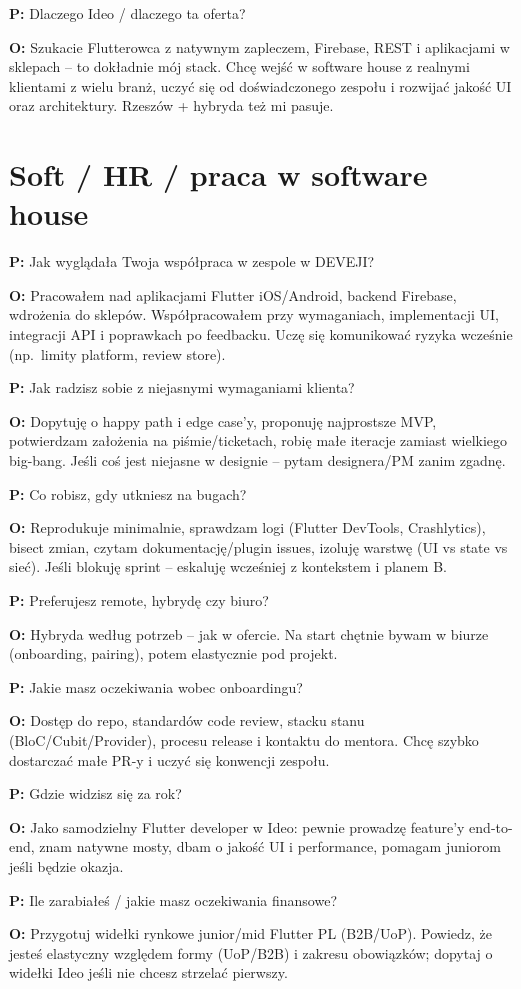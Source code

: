 \documentclass[11pt,a4paper]{article}
\newcommand{\pyt}[1]{\par\medskip\noindent\textbf{P:} #1\par}
\newcommand{\odp}[1]{\noindent\textbf{O:} #1\par}
\begin{document}
\pyt{Dlaczego Ideo / dlaczego ta oferta?}
\odp{Szukacie Flutterowca z natywnym zapleczem, Firebase, REST i aplikacjami w sklepach -- to dokładnie mój stack. Chcę wejść w software house z realnymi klientami z wielu branż, uczyć się od doświadczonego zespołu i rozwijać jakość UI oraz architektury. Rzeszów + hybryda też mi pasuje.}

\section{Soft / HR / praca w software house}

\pyt{Jak wyglądała Twoja współpraca w zespole w DEVEJI?}
\odp{Pracowałem nad aplikacjami Flutter iOS/Android, backend Firebase, wdrożenia do sklepów. Współpracowałem przy wymaganiach, implementacji UI, integracji API i poprawkach po feedbacku. Uczę się komunikować ryzyka wcześnie (np.\ limity platform, review store).}

\pyt{Jak radzisz sobie z niejasnymi wymaganiami klienta?}
\odp{Dopytuję o happy path i edge case'y, proponuję najprostsze MVP, potwierdzam założenia na piśmie/ticketach, robię małe iteracje zamiast wielkiego big-bang. Jeśli coś jest niejasne w designie -- pytam designera/PM zanim zgadnę.}

\pyt{Co robisz, gdy utkniesz na bugach?}
\odp{Reprodukuje minimalnie, sprawdzam logi (Flutter DevTools, Crashlytics), bisect zmian, czytam dokumentację/plugin issues, izoluję warstwę (UI vs state vs sieć). Jeśli blokuję sprint -- eskaluję wcześniej z kontekstem i planem B.}

\pyt{Preferujesz remote, hybrydę czy biuro?}
\odp{Hybryda według potrzeb -- jak w ofercie. Na start chętnie bywam w biurze (onboarding, pairing), potem elastycznie pod projekt.}

\pyt{Jakie masz oczekiwania wobec onboardingu?}
\odp{Dostęp do repo, standardów code review, stacku stanu (BloC/Cubit/Provider), procesu release i kontaktu do mentora. Chcę szybko dostarczać małe PR-y i uczyć się konwencji zespołu.}

\pyt{Gdzie widzisz się za rok?}
\odp{Jako samodzielny Flutter developer w Ideo: pewnie prowadzę feature'y end-to-end, znam natywne mosty, dbam o jakość UI i performance, pomagam juniorom jeśli będzie okazja.}

\pyt{Ile zarabiałeś / jakie masz oczekiwania finansowe?}
\odp{Przygotuj widełki rynkowe junior/mid Flutter PL (B2B/UoP). Powiedz, że jesteś elastyczny względem formy (UoP/B2B) i zakresu obowiązków; dopytaj o widełki Ideo jeśli nie chcesz strzelać pierwszy.}
\end{document}
